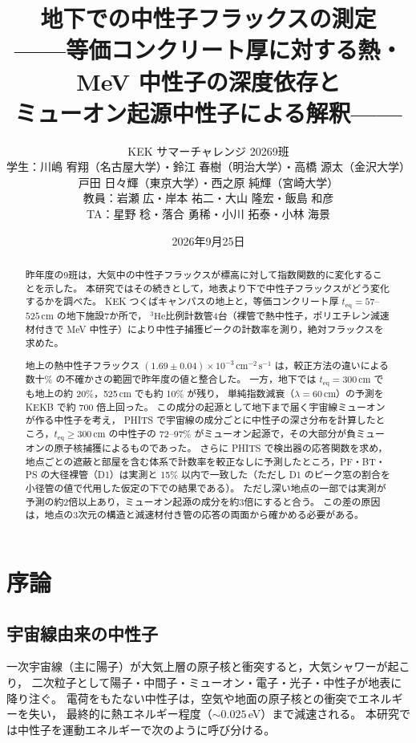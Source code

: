 \documentclass[a4paper,11pt]{ltjsarticle}
\title{地下での中性子フラックスの測定\\[4pt]
\large ——等価コンクリート厚に対する熱・MeV 中性子の深度依存と\\ミューオン起源中性子による解釈——}
\author{KEK サマーチャレンジ 2026\quad 9班\\[6pt]
\small 学生：川嶋 宥翔（名古屋大学）・鈴江 春樹（明治大学）・高橋 源太（金沢大学）\\
\small 戸田 日々輝（東京大学）・西之原 純輝（宮崎大学）\\[2pt]
\small 教員：岩瀬 広・岸本 祐二・大山 隆宏・飯島 和彦\\[2pt]
\small TA：星野 稔・落合 勇稀・小川 拓泰・小林 海景}
\date{2026年9月25日}
\newcommand{\He}{\ensuremath{{}^{3}\mathrm{He}}}
\newcommand{\teq}{t_{\mathrm{eq}}}
\newcommand{\flux}{\mathrm{cm^{-2}\,s^{-1}}}
\begin{document}
\maketitle

\begin{abstract}
昨年度の9班は，大気中の中性子フラックスが標高に対して指数関数的に変化することを示した。
本研究ではその続きとして，地表より下で中性子フラックスがどう変化するかを調べた。
KEK つくばキャンパスの地上と，等価コンクリート厚 $\teq=57$--$525$\,cm の地下施設7か所で，
\He 比例計数管4台（裸管で熱中性子，ポリエチレン減速材付きで MeV 中性子）により中性子捕獲ピークの計数率を測り，絶対フラックスを求めた。

地上の熱中性子フラックス $(1.69\pm0.04)\times10^{-3}\,\flux$ は，較正方法の違いによる数十\% の不確かさの範囲で昨年度の値と整合した。
一方，地下では $\teq=300$\,cm でも地上の約 20\%，525\,cm でも約 10\% が残り，
単純指数減衰（$\lambda=60$\,cm）の予測を KEKB で約 700 倍上回った。
この成分の起源として地下まで届く宇宙線ミューオンが作る中性子を考え，
PHITS で宇宙線の成分ごとに中性子の深さ分布を計算したところ，$\teq\ge300$\,cm の中性子の 72--97\% がミューオン起源で，その大部分が負ミューオンの原子核捕獲によるものであった。
さらに PHITS で検出器の応答関数を求め，地点ごとの遮蔽と部屋を含む体系で計数率を較正なしに予測したところ，PF・BT・PS の大径裸管（D1）は実測と 15\% 以内で一致した（ただし D1 のピーク窓の割合を小径管の値で代用した仮定の下での結果である）。
ただし深い地点の一部では実測が予測の約2倍以上あり，ミューオン起源の成分を約3倍にすると合う。
この差の原因は，地点の3次元の構造と減速材付き管の応答の両面から確かめる必要がある。
\end{abstract}

\newpage
\begingroup
\linespread{0.92}\small\selectfont
\tableofcontents
\endgroup
\newpage

\section{序論}

\subsection{宇宙線由来の中性子}

一次宇宙線（主に陽子）が大気上層の原子核と衝突すると，大気シャワーが起こり，
二次粒子として陽子・中間子・ミューオン・電子・光子・中性子が地表に降り注ぐ。
電荷をもたない中性子は，空気や地面の原子核との衝突でエネルギーを失い，
最終的に熱エネルギー程度（$\sim0.025$\,eV）まで減速される。
本研究では中性子を運動エネルギーで次のように呼び分ける。
\end{document}
